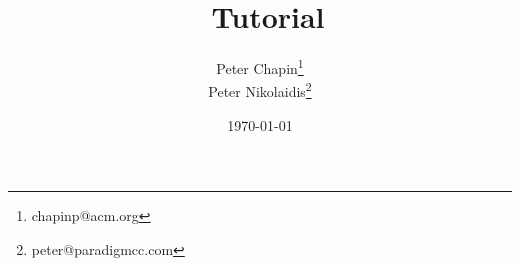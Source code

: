 \documentclass{report}
\begin{document}
\title{\CLAC\ Tutorial}
\author{Peter Chapin\thanks{chapinp@acm.org}\\
        Peter Nikolaidis\thanks{peter@paradigmcc.com}}
\date{\today}
\maketitle

\tableofcontents
\newpage
{}





\end{document}
